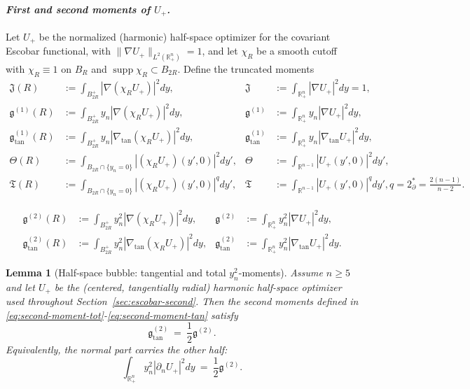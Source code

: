 \documentclass[11pt,reqno,a4paper]{amsart}
\newcommand{\R}{\mathbb{R}}
\numberwithin{equation}{section}
\theoremstyle{plain}
\newtheorem{lemma}[theorem]{Lemma}
\theoremstyle{remark}
\theoremstyle{plain}
\begin{document}
\paragraph{\emph{First and second moments of $U_+$.}}
Let $U_+$ be the normalized (harmonic) half-space optimizer for the covariant Escobar functional,
with $\|\nabla U_+\|_{L^2(\R^n_+)}=1$, and let $\chi_R$ be a smooth cutoff with $\chi_R\equiv1$ on $B_R$
and $\operatorname{supp}\chi_R\subset B_{2R}$. Define the truncated moments
\begin{align}
\mathfrak{J}(R) &:= \int_{B^+_{2R}} |\nabla(\chi_R U_+)|^2dy,
& \mathfrak{J} &:= \int_{\R^n_+} |\nabla U_+|^2dy = 1, \label{eq:Jflat}\\
\mathfrak g^{(1)}(R) &:= \int_{B^+_{2R}} y_n|\nabla(\chi_R U_+)|^2dy,
& \mathfrak g^{(1)} &:= \int_{\R^n_+} y_n|\nabla U_+|^2dy, \label{eq:first-moments}\\
\mathfrak g^{(1)}_{\mathrm{tan}}(R) &:= \int_{B^+_{2R}} y_n|\nabla_{\mathrm{tan}}(\chi_R U_+)|^2dy,
& \mathfrak g^{(1)}_{\mathrm{tan}} &:= \int_{\R^n_+} y_n|\nabla_{\mathrm{tan}} U_+|^2dy, \label{eq:tan-moment}\\
\Theta(R) &:= \int_{B_{2R}\cap\{y_n=0\}} |(\chi_R U_+)(y',0)|^2dy',
& \Theta &:= \int_{\R^{n-1}} |U_+(y',0)|^2dy', \label{eq:theta-trace}\\
\mathfrak{T}(R) &:= \int_{B_{2R}\cap\{y_n=0\}} |(\chi_R U_+)(y',0)|^{q}dy',
& \mathfrak{T} &:= \int_{\R^{n-1}} |U_+(y',0)|^{q}dy', q=2^*_\partial=\tfrac{2(n-1)}{n-2}. \label{eq:trace-q}
\end{align}

\begin{align}
 \mathfrak g^{(2)}(R) &:= \int_{B^+_{2R}} y_n^{2}|\nabla(\chi_R U_+)|^2dy,
 & \mathfrak g^{(2)} &:= \int_{\R^n_+} y_n^{2}|\nabla U_+|^2dy,
 \label{eq:second-moment-tot}\\
 \mathfrak g^{(2)}_{\mathrm{tan}}(R) &:= \int_{B^+_{2R}} y_n^{2}|\nabla_{\mathrm{tan}}(\chi_R U_+)|^2dy,
 & \mathfrak g^{(2)}_{\mathrm{tan}} &:= \int_{\R^n_+} y_n^{2}|\nabla_{\mathrm{tan}} U_+|^2dy.
 \label{eq:second-moment-tan}
\end{align}

\begin{lemma}[Half-space bubble: tangential and total $y_n^2$-moments]\label{lem:tan-half-moment}
Assume $n\ge5$ and let $U_+$ be the (centered, tangentially radial) harmonic half-space optimizer used throughout
Section~\ref{sec:escobar-second}. Then the second moments defined in
\eqref{eq:second-moment-tot}-\eqref{eq:second-moment-tan} satisfy
\[
\mathfrak g^{(2)}_{\mathrm{tan}}\ =\ \frac12\mathfrak g^{(2)}.
\]
Equivalently, the normal part carries the other half:
\[
\int_{\R^n_+} y_n^2|\partial_n U_+|^2dy\ =\ \frac12\mathfrak g^{(2)}.
\]
\end{lemma}
\end{document}
